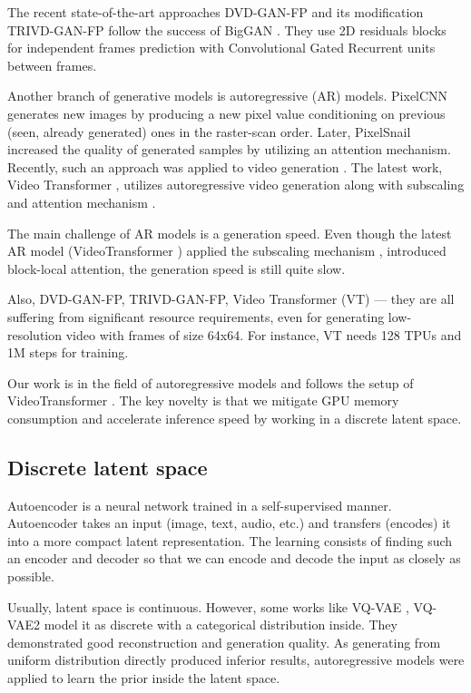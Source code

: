 \documentclass{article}
\begin{document}
The recent state-of-the-art approaches DVD-GAN-FP \cite{dvdgan} and its modification TRIVD-GAN-FP \cite{dvdgan2} follow the success of BigGAN \cite{biggan}. They use 2D residuals blocks for independent frames prediction with Convolutional Gated Recurrent units between frames.

Another branch of generative models is autoregressive (AR) models. PixelCNN \cite{pixelcnn, pixelcnn++} generates new images by producing a new pixel value conditioning on previous (seen, already generated) ones in the raster-scan order. Later, PixelSnail \cite{pixelsnail} increased the quality of generated samples by utilizing an attention mechanism. Recently, such an approach was applied to video generation \cite{video_pixel_networks, vt}. The latest work, Video Transformer \cite{vt}, utilizes autoregressive video generation along with subscaling \cite{pixelcnn_subscale} and attention mechanism \cite{transformer}.

The main challenge of AR models is a generation speed. Even though the latest AR model (VideoTransformer \cite{vt}) applied the subscaling mechanism \cite{pixelcnn_subscale}, introduced block-local attention, the generation speed is still quite slow.

Also, DVD-GAN-FP, TRIVD-GAN-FP, Video Transformer (VT) --- they are all suffering from significant resource requirements, even for generating low-resolution video with frames of size 64x64. For instance, VT needs 128 TPUs and 1M steps for training.

Our work is in the field of autoregressive models and follows the setup of VideoTransformer \cite{vt}. The key novelty is that we mitigate GPU memory consumption and accelerate inference speed by working in a discrete latent space.

\subsection{Discrete latent space}

Autoencoder is a neural network trained in a self-supervised manner. Autoencoder takes an input (image, text, audio, etc.) and transfers (encodes) it into a more compact latent representation. The learning consists of finding such an encoder and decoder so that we can encode and decode the input as closely as possible.

Usually, latent space is continuous. However, some works like VQ-VAE \cite{vqvae}, VQ-VAE2 \cite{vqvae2} model it as discrete with a categorical distribution inside. They demonstrated good reconstruction and generation quality. As generating from uniform distribution directly produced inferior results, autoregressive models were applied to learn the prior inside the latent space.
\end{document}
